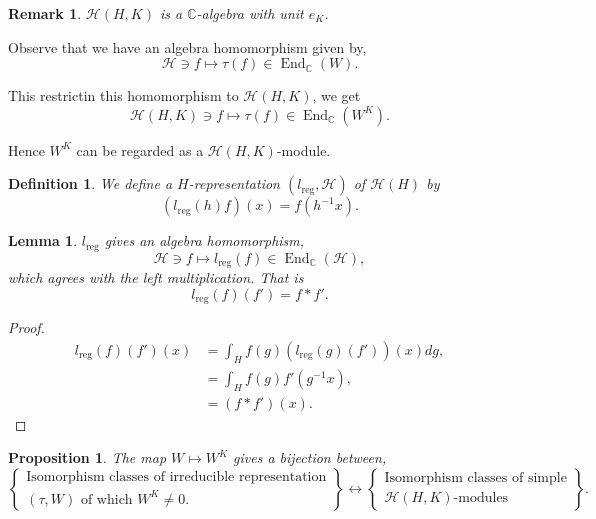 \documentclass[8pt]{article}
\newtheorem{proposition}{Proposition}[section]
\newtheorem{definition}{Definition}[section]
\newtheorem{lemma}{Lemma}[section]
\newtheorem{remark}{Remark}[section]
\DeclareMathOperator{\End}{End}
\DeclareMathOperator{\reg}{reg}
\newcommand{\C}[0]{\mathbb{C}}
\newcommand{\hecke}[0]{\mathscr{H}}
\begin{document}
\begin{remark}
  $\hecke(H,K)$ is a $\C$-algebra with unit $e_K$.
\end{remark}

Observe that we have an algebra homomorphism given by,
\begin{equation*}
  \hecke\ni f\mapsto \tau(f)\in\End_\C(W).
\end{equation*}

This restrictin this homomorphism to $\hecke(H,K)$, we get 
\begin{equation*}
  \hecke(H,K)\ni f\mapsto \tau(f)\in\End_\C(W^K).
\end{equation*}

Hence $W^K$ can be regarded as a $\hecke(H,K)$-module.

\begin{definition}
  We define a $H$-representation $(l_{\reg},\hecke)$ of $\hecke(H)$ by 
  \begin{equation*}
    (l_{\reg}(h)f)(x) = f(h^{-1}x).
  \end{equation*}
\end{definition}

\begin{lemma}
  $l_{\reg}$ gives an algebra homomorphism,
  \begin{equation*}
    \hecke\ni f\mapsto l_{\reg}(f)\in\End_\C(\hecke),
  \end{equation*}
  which agrees with the left multiplication. That is 
  \begin{equation*}
    l_{\reg}(f)(f') = f\ast f'.
  \end{equation*}
  \label{lemma_l_reg_multi}
\end{lemma}

\begin{proof}
  \begin{align*}
    l_{\reg}(f)(f')(x) & = \int_H f(g)(l_{\reg}(g)(f'))(x)dg,\\
    & = \int_Hf(g)f'(g^{-1}x),\\
    & = (f\ast f')(x).
  \end{align*}
\end{proof}

\begin{proposition}
  \label{proposition_34}
  The map $W\mapsto W^K$ gives a bijection between,
  \begin{equation*}
    \left\{\substack{\text{Isomorphism classes of irreducible representation}\\\text{$(\tau,W)$ of which $W^K\not=0$.}}\right\}\leftrightarrow \left\{\substack{\text{Isomorphism classes of simple}\\\text{$\hecke(H,K)$-modules}}\right\}.
  \end{equation*}
\end{proposition}
\end{document}

